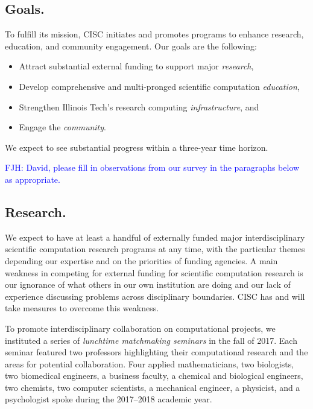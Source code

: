 \documentclass[12pt]{amsart}
\newcommand{\FJHNote}[1]{{\textcolor{blue}{FJH: #1}}}
\begin{document}
\subsection*{Goals.}
To fulfill its mission, CISC initiates and promotes programs to enhance research, education, and community engagement.  Our goals are the following:
\begin{itemize}
    \item Attract substantial external funding to support major \emph{research},
    
    \item Develop comprehensive and multi-pronged scientific computation \emph{education},

    \item Strengthen Illinois Tech's research computing \emph{infrastructure}, and
    
    \item Engage the \emph{community}.
    
\end{itemize}
We expect to see substantial progress within a three-year time horizon.

\FJHNote{David, please fill in observations from our survey in the paragraphs below as appropriate.}

\subsection*{Research.} We expect to have at least a handful of externally funded major interdisciplinary scientific computation research programs at any time, with the particular themes depending our expertise and on the priorities of funding agencies.  A main weakness in competing for external funding for scientific computation research is our ignorance of what others in our own institution are doing and our lack of experience discussing problems across disciplinary boundaries.  CISC has and will take measures to overcome this weakness.

To promote interdisciplinary collaboration on computational projects, we instituted a series of \emph{lunchtime matchmaking seminars} in the fall of 2017.  Each seminar featured two professors highlighting their computational research and the areas for potential collaboration.  Four applied mathematicians, two biologists, two biomedical engineers, a business faculty, a chemical and biological engineers, two chemists, two computer scientists,  a mechanical engineer, a physicist, and a psychologist spoke during the 2017--2018 academic year.  
\end{document}
